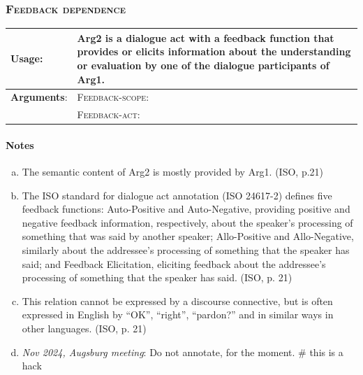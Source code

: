 \documentclass{udisc}
\begin{document}
\begin{itemize}

\subsubsection{\textsc{Feedback dependence}}

\begin{tabularx}{\textwidth}{|l|L|}
\hline

\textbf{Usage}:           &  Arg2 is a dialogue act with a feedback function that provides or elicits information
about the understanding or evaluation by one of the dialogue participants of Arg1. \\
\hline

\textbf{Arguments}:       &  \textsc{Feedback-scope}: \\
                          &  \textsc{Feedback-act}: \\
\hline

\end{tabularx}

\paragraph{Notes}

\begin{enumerate}[a)]
\item The semantic content of Arg2 is mostly provided by Arg1. (ISO, p.21)
\item The ISO standard for dialogue act annotation (ISO 24617-2) defines five feedback functions:
Auto-Positive and Auto-Negative, providing positive and negative feedback information,
respectively, about the speaker’s processing of something that was said by another speaker;
Allo-Positive and Allo-Negative, similarly about the addressee’s processing of something
that the speaker has said; and Feedback Elicitation, eliciting feedback about the addressee’s
processing of something that the speaker has said. (ISO, p. 21)
\item 
This relation cannot be expressed by a discourse connective, but is often expressed in English
by “OK”, “right”, “pardon?” and in similar ways in other languages. (ISO, p. 21)
\item \emph{Nov 2024, Augsburg meeting}: Do not annotate, for the moment.
\nonstopmode # this is a hack
\end{enumerate}
\errorstopmode



\end{itemize}
\end{document}
